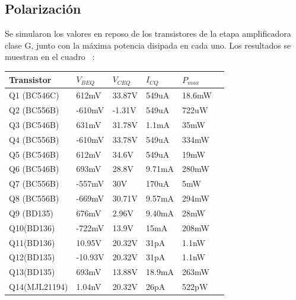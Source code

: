 
\subsection{Polarización}

\par Se simularon los valores en reposo de los transistores de la etapa amplificadora clase G, junto con la máxima potencia disipada en cada uno. Los resultados se muestran en el cuadro ~:\\


\begin{table}[H]
    \setlength\arrayrulewidth{1pt}
    \begin{center}
        \begin{tabular}{llllll}
        \hline\hline
            Transistor & $V_{BEQ}$ & $V_{CEQ}$ & $I_{CQ}$ & $P_{max}$\\
            \hline \hline
            Q1 (BC546C)     & 612mV     & 33.87V    & 549uA     & 18.6mW    \\
            Q2 (BC556B)     & -610mV    & -1.31V    & 549uA     & 722uW     \\
            Q3 (BC546B)     & 631mV     & 31.78V    & 1.1mA     & 35mW      \\
            Q4 (BC556B)     & -610mV    & 33.78V    & 549uA     & 334mW     \\
            Q5 (BC546B)     & 612mV     & 34.6V     & 549uA     & 19mW      \\
            Q6 (BC546B)     & 693mV     & 28.8V     & 9.71mA    & 280mW     \\
            Q7 (BC556B)     & -557mV    & 30V       & 170uA     & 5mW       \\
            Q8 (BC556B)     & -669mV    & 30.71V    & 9.57mA    & 294mW     \\ 
            Q9 (BD135)      & 676mV     & 2.96V     & 9.40mA    & 28mW      \\
            Q10(BD136)      & -722mV    & 13.9V     & 15mA      & 208mW     \\
            Q11(BD136)      & 10.95V    & 20.32V    & 31pA      & 1.1nW     \\
            Q12(BD135)      & -10.93V   & 20.32V    & 31pA      & 1.1nW     \\
            Q13(BD135)      & 693mV     & 13.88V    & 18.9mA    & 263mW     \\
            Q14(MJL21194)   & 1.04nV    & 20.32V    & 26pA      & 522pW     \\

\end{tabular}
\end{center}
\end{table}
